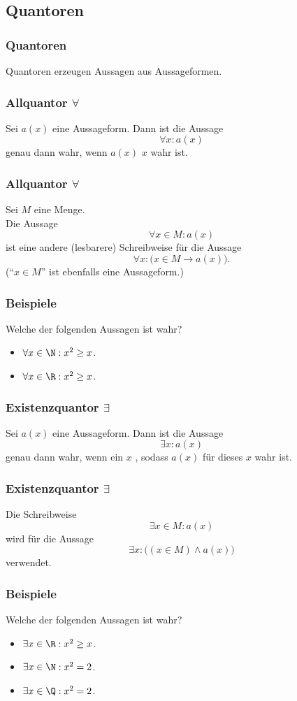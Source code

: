 \subsection{Quantoren}
%
\begin{frame}\frametitle{Quantoren}
	
	Quantoren erzeugen Aussagen aus Aussageformen.
	
\end{frame}
%
%
\begin{frame}\frametitle{Allquantor $\forall$}
	
	Sei $a(x)$ eine Aussageform. Dann ist die Aussage 
	$$
		\forall x: a(x)
	$$
	genau dann wahr, wenn $a(x)$  $x$ wahr ist.
	
\end{frame}
%
%
\begin{frame}\frametitle{Allquantor $\forall$}
	
	Sei $M$ eine Menge.\\[2mm]
	Die Aussage 
	$$
		\forall x\in M: a(x)
	$$
	ist eine andere (lesbarere) Schreibweise für die Aussage
	$$
		\forall x: \big(x\in M \rightarrow a(x) \big) .
	$$
	(``$x\in M$'' ist ebenfalls eine Aussageform.)
\end{frame}
%
%
\begin{frame}\frametitle{Beispiele}
	
	Welche der folgenden Aussagen ist wahr?
	\begin{itemize}
		\item $\forall x\in \N: x^2 \geq x$. 
		\item $\forall x\in \R: x^2 \geq x$.
	\end{itemize}
	
\end{frame}
%
%
\begin{frame}\frametitle{Existenzquantor $\exists$}

	Sei $a(x)$ eine Aussageform. Dann ist die Aussage 
	$$
		\exists x: a(x)
	$$
	genau dann wahr, wenn ein $x$ , sodass $a(x)$ für dieses $x$ wahr ist.

\end{frame}
%
%
\begin{frame}\frametitle{Existenzquantor $\exists$}

	Die Schreibweise
	$$
		\exists x \in M: a(x)
	$$
	wird für die Aussage
	$$
		\exists x: \big( (x\in M) \land a(x) \big)
	$$ 
	verwendet.
	
\end{frame}
%
%
\begin{frame}\frametitle{Beispiele}
	
	Welche der folgenden Aussagen ist wahr?
	\begin{itemize}
		\item $\exists x\in \R: x^2 \geq x$.
		\item $\exists x\in\N: x^2 = 2$.
		\item $\exists x\in\Q: x^2 = 2$.
	\end{itemize}
	
\end{frame}
